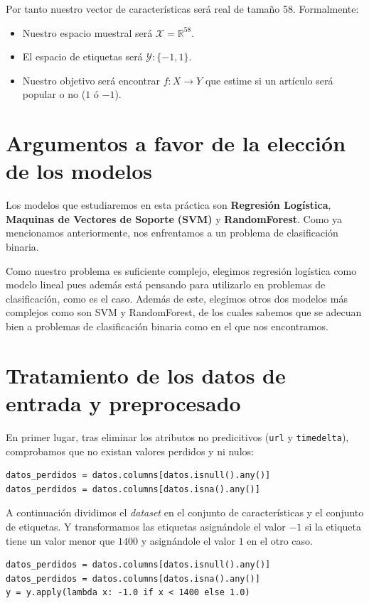 \documentclass[size=a4, parskip=half, titlepage=false, toc=flat, toc=bib, 12pt]{scrartcl}
\begin{document}
Por tanto nuestro vector de características será real de tamaño 58. Formalmente:
\begin{itemize}
\item Nuestro espacio muestral será $ \mathcal{X}= \mathbb{R}^{58}$.
\item El espacio de etiquetas será $\mathcal{Y}: \{-1,1\}$.
\item Nuestro objetivo será encontrar $f:X \rightarrow Y$ que estime si un artículo será popular o no (\(1\) ó \(-1\)).
\end{itemize}
\section{Argumentos a favor de la elección de los modelos}

Los modelos que estudiaremos en esta práctica son \textbf{Regresión Logística}, \textbf{Maquinas de Vectores de Soporte} \textbf{(SVM)} y \textbf{RandomForest}. Como ya mencionamos anteriormente, nos enfrentamos a un problema de clasificación binaria.

Como nuestro problema es suficiente complejo, elegimos regresión logística como modelo lineal pues además está pensando para utilizarlo en problemas de clasificación, como es el caso. Además de este, elegimos otros dos modelos más complejos como son SVM y RandomForest, de los cuales sabemos que se adecuan bien a problemas de clasificación binaria como en el que nos encontramos.

\section{Tratamiento de los datos de entrada y preprocesado}
En primer lugar, tras eliminar los atributos no predicitivos (\verb|url| y \verb|timedelta|), comprobamos que no existan valores perdidos y ni nulos:
\begin{verbatim}
datos_perdidos = datos.columns[datos.isnull().any()]
datos_perdidos = datos.columns[datos.isna().any()]
\end{verbatim}
A continuación dividimos el \textit{dataset} en el conjunto de características y el conjunto de etiquetas. Y transformamos las etiquetas asignándole el valor $-1$ si la etiqueta tiene un valor menor que $1400$ y asignándole el valor $1$ en el otro caso.
\begin{verbatim}
datos_perdidos = datos.columns[datos.isnull().any()]
datos_perdidos = datos.columns[datos.isna().any()]
y = y.apply(lambda x: -1.0 if x < 1400 else 1.0)
\end{verbatim}
\end{document}
